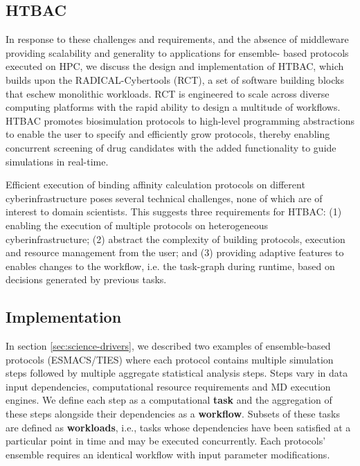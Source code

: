 \subsection{HTBAC}

In response to these challenges and requirements, and the absence of
middleware providing scalability and generality to applications for ensemble-
based protocols executed on HPC, we discuss the design and implementation of
HTBAC, which builds upon the RADICAL-Cybertools (RCT), a set of software
building blocks that eschew monolithic workloads. RCT is engineered to scale
across diverse computing platforms with the rapid ability to design a
multitude of workflows. HTBAC promotes biosimulation protocols to high-level
programming abstractions to enable the user to specify and efficiently grow
protocols, thereby enabling concurrent screening of drug candidates with the
added functionality to guide simulations in real-time.


Efficient execution of binding affinity calculation protocols on different
cyberinfrastructure poses several technical challenges, none of which are of
interest to domain scientists. This suggests three requirements for HTBAC\@:
(1) enabling the execution of multiple protocols on heterogeneous
cyberinfrastructure; (2) abstract the complexity of building protocols,
execution and resource management from the user; and (3) providing adaptive
features to enables changes to the workflow, i.e. the task-graph during
runtime, based on decisions generated by previous tasks.


\subsection{Implementation}

In section \ref{sec:science-drivers}, we described two examples of ensemble-based protocols (ESMACS/TIES)
where each protocol contains multiple simulation steps followed by multiple 
aggregate statistical analysis steps. Steps vary in data input dependencies, 
computational resource requirements and MD execution engines. We define 
each step as a computational \textbf{task} and the aggregation of these 
steps alongside their dependencies as a \textbf{workflow}. Subsets of 
these tasks are defined as \textbf{workloads}, i.e., tasks whose dependencies 
have been satisfied at a particular point in time and may be executed 
concurrently. Each protocols' ensemble requires an identical workflow 
with input parameter modifications.

